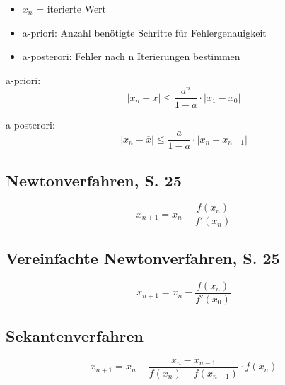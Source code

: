 \begin{itemize}
\item $x_n$ = iterierte Wert
\item a-priori: Anzahl benötigte Schritte für Fehlergenauigkeit
\item a-posterori: Fehler nach n Iterierungen bestimmen
\end{itemize}

a-priori:
\[|x_n - \overline{x}| \leq{} \frac{a^n}{1 - a} \cdot |x_1 - x_0|\]

a-posterori:
\[|x_n - \overline{x}| \leq{} \frac{a}{1 - a} \cdot |x_n - x_{n-1}|\]

\subsection{Newtonverfahren, S. 25}

\[x_{n+1} = x_n - \frac{f(x_n)}{f'(x_n)}\]

\subsection{Vereinfachte Newtonverfahren, S. 25}

\[x_{n+1} = x_n - \frac{f(x_n)}{f'(x_0)}\]

\subsection{Sekantenverfahren}

\[x_{n+1} = x_n - \frac{x_n-x_{n-1}}{f(x_n) - f(x_{n-1})} \cdot f(x_n)\]



